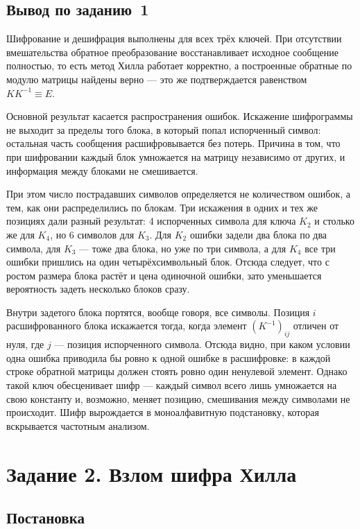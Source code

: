 \documentclass[a4paper,14pt]{extarticle}
\begin{document}
\subsection*{Вывод по заданию~1}

Шифрование и дешифрация выполнены для всех трёх ключей. При отсутствии вмешательства
обратное преобразование восстанавливает исходное сообщение полностью, то есть метод
Хилла работает корректно, а построенные обратные по модулю матрицы найдены верно ---
это же подтверждается равенством $K K^{-1} \equiv E$.

Основной результат касается распространения ошибок. Искажение шифрограммы не выходит
за пределы того блока, в который попал испорченный символ: остальная часть сообщения
расшифровывается без потерь. Причина в том, что при шифровании каждый блок умножается
на матрицу независимо от других, и информация между блоками не смешивается.

При этом число пострадавших символов определяется не количеством ошибок, а тем, как
они распределились по блокам. Три искажения в одних и тех же позициях дали разный
результат: 4 испорченных символа для ключа $K_2$ и столько же для $K_4$, но 6 символов
для $K_3$. Для $K_2$ ошибки задели два блока по два символа, для $K_3$ --- тоже два
блока, но уже по три символа, а для $K_4$ все три ошибки пришлись на один
четырёхсимвольный блок. Отсюда следует, что с ростом размера блока растёт и цена
одиночной ошибки, зато уменьшается вероятность задеть несколько блоков сразу.

Внутри задетого блока портятся, вообще говоря, все символы. Позиция $i$ расшифрованного
блока искажается тогда, когда элемент $(K^{-1})_{ij}$ отличен от нуля, где $j$ ---
позиция испорченного символа. Отсюда видно, при каком условии одна ошибка приводила бы
ровно к одной ошибке в расшифровке: в каждой строке обратной матрицы должен стоять
ровно один ненулевой элемент. Однако такой ключ обесценивает шифр --- каждый символ
всего лишь умножается на свою константу и, возможно, меняет позицию, смешивания между
символами не происходит. Шифр вырождается в моноалфавитную подстановку, которая
вскрывается частотным анализом.

\section{Задание 2. Взлом шифра Хилла}

\subsection{Постановка}
\end{document}
